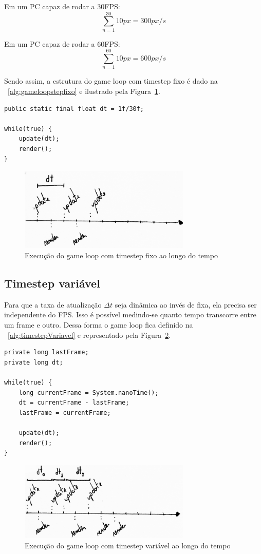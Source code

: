 \documentclass[12pt, 
openright, 
oneside, 
a4paper,    
brazil]{facom-ufu-abntex2}
\begin{document}
\noindent
Em um PC capaz de rodar a 30FPS: $$\sum_{n=1}^{30} 10px = 300 px/s$$

\noindent
Em um PC capaz de rodar a 60FPS: $$\sum_{n=1}^{60} 10px = 600 px/s$$

\noindent
Sendo assim, a estrutura do game loop com timestep fixo é dado na \lstlistingname~\ref{alg:gameloopstepfixo} e ilustrado pela Figura~\ref{fig:timeStepFixoAoTempo}.
\begin{lstlisting}[caption=Game Loop com timestep fixo, label={alg:gameloopstepfixo}]
public static final float dt = 1f/30f;

while(true) {
	update(dt);
	render();
}
\end{lstlisting}

\begin{figure}[H]
	\centering
	\includegraphics[width=22em]{imagens/ilu2_small.png}
	\caption{Execução do game loop com timestep fixo ao longo do tempo}
	\label{fig:timeStepFixoAoTempo}
\end{figure}

\subsection{Timestep variável}
Para que a taxa de atualização $\Delta t$ seja dinâmica ao invés de fixa, ela precisa ser independente do FPS. Isso é possível medindo-se quanto tempo transcorre entre um frame e outro. Dessa forma o game loop fica definido na \lstlistingname~\ref{alg:timestepVariavel} e representado pela Figura~\ref{fig:gameLooptimeStepVariavel}.

\begin{lstlisting}[caption=Game loop com timestep variável, label={alg:timestepVariavel}]
private long lastFrame;
private long dt;
		
while(true) {
	long currentFrame = System.nanoTime(); 
	dt = currentFrame - lastFrame;
	lastFrame = currentFrame;
	
	update(dt);
	render();
}
\end{lstlisting}

\begin{figure}[H]
	\centering
	\includegraphics[width=22em]{imagens/ilu3_small.png}
	\caption{Execução do game loop com timestep variável ao longo do tempo}
	\label{fig:gameLooptimeStepVariavel}
\end{figure}
\end{document}
